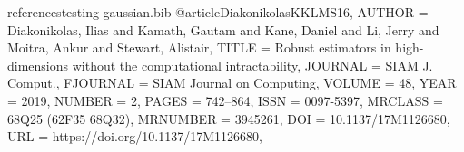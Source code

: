 \documentclass[10pt]{article}
\theoremstyle{plain}
\begin{document}
\begin{filecontents}{referencestesting-gaussian.bib}
@article{DiakonikolasKKLMS16,
    AUTHOR = {Diakonikolas, Ilias and Kamath, Gautam and Kane, Daniel and
              Li, Jerry and Moitra, Ankur and Stewart, Alistair},
     TITLE = {Robust estimators in high-dimensions without the computational
              intractability},
   JOURNAL = {SIAM J. Comput.},
  FJOURNAL = {SIAM Journal on Computing},
    VOLUME = {48},
      YEAR = {2019},
    NUMBER = {2},
     PAGES = {742--864},
      ISSN = {0097-5397},
   MRCLASS = {68Q25 (62F35 68Q32)},
  MRNUMBER = {3945261},
       DOI = {10.1137/17M1126680},
       URL = {https://doi.org/10.1137/17M1126680},
}
\end{filecontents}


\end{document}
